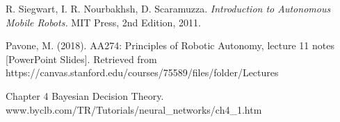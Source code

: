\documentclass[twoside]{article}
\begin{document}
\begin{thebibliography}{9}

R. Siegwart, I. R. Nourbakhsh, D. Scaramuzza. \textit{Introduction to Autonomous Mobile Robots.} MIT Press, 2nd Edition, 2011.

\label{bib:lecnotes}
Pavone, M. (2018). AA274: Principles of Robotic Autonomy, lecture 11 notes [PowerPoint Slides]. Retrieved from
https://canvas.stanford.edu/courses/75589/files/folder/Lectures

Chapter 4 Bayesian Decision Theory. www.byclb.com/TR/Tutorials/neural\_networks/ch4\_1.htm

\end{thebibliography}
\end{document}
